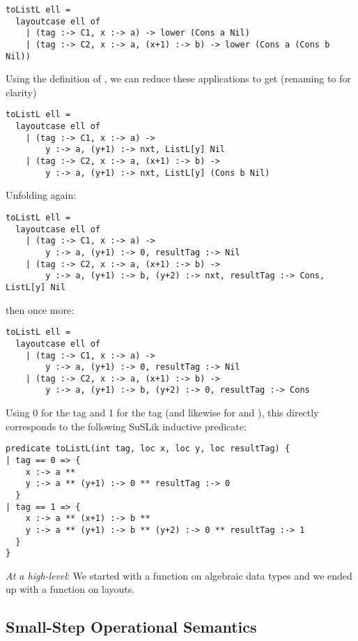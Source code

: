 \documentclass[10pt]{article}
\begin{document}
\begin{lstlisting}
toListL ell =
  layoutcase ell of
    | (tag :-> C1, x :-> a) -> lower (Cons a Nil)
    | (tag :-> C2, x :-> a, (x+1) :-> b) -> lower (Cons a (Cons b Nil))
\end{lstlisting}

\noindent
Using the definition of , we can reduce these  applications to get (renaming  to  for clarity)

\begin{lstlisting}
toListL ell =
  layoutcase ell of
    | (tag :-> C1, x :-> a) ->
        y :-> a, (y+1) :-> nxt, ListL[y] Nil
    | (tag :-> C2, x :-> a, (x+1) :-> b) ->
        y :-> a, (y+1) :-> nxt, ListL[y] (Cons b Nil)
\end{lstlisting}

\noindent
Unfolding  again:

\begin{lstlisting}
toListL ell =
  layoutcase ell of
    | (tag :-> C1, x :-> a) ->
        y :-> a, (y+1) :-> 0, resultTag :-> Nil
    | (tag :-> C2, x :-> a, (x+1) :-> b) ->
        y :-> a, (y+1) :-> b, (y+2) :-> nxt, resultTag :-> Cons, ListL[y] Nil
\end{lstlisting}

\noindent
then once more:

\begin{lstlisting}
toListL ell =
  layoutcase ell of
    | (tag :-> C1, x :-> a) ->
        y :-> a, (y+1) :-> 0, resultTag :-> Nil
    | (tag :-> C2, x :-> a, (x+1) :-> b) ->
        y :-> a, (y+1) :-> b, (y+2) :-> 0, resultTag :-> Cons
\end{lstlisting}

Using 0 for the  tag and 1 for the  tag (and likewise for  and ), this directly corresponds to the following SuSLik
inductive predicate:

\begin{lstlisting}
predicate toListL(int tag, loc x, loc y, loc resultTag) {
| tag == 0 => {
    x :-> a **
    y :-> a ** (y+1) :-> 0 ** resultTag :-> 0
  }
| tag == 1 => {
    x :-> a ** (x+1) :-> b **
    y :-> a ** (y+1) :-> b ** (y+2) :-> 0 ** resultTag :-> 1
  }
}
\end{lstlisting}

\noindent
\textit{At a high-level}: We started with a function on algebraic data types and we ended up with a function
on layouts.

\subsection{Small-Step Operational Semantics}
\end{document}
